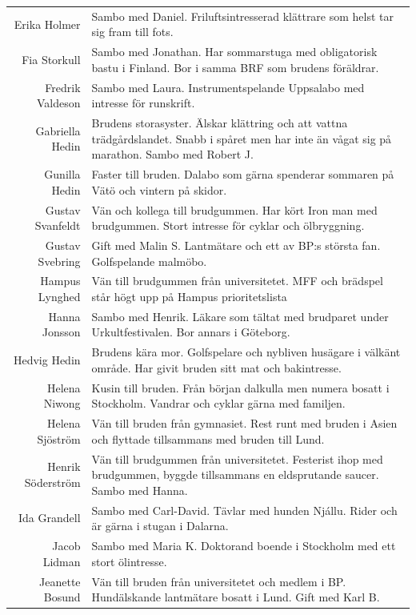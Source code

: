 \documentclass[a5paper]{article}
\begin{document}
\begin{longtable}[l]{N|L}
				Erika Holmer	&	Sambo med Daniel. Friluftsintresserad klättrare som helst tar sig fram till fots.	\\
				Fia Storkull	&	Sambo med Jonathan.  Har sommarstuga med obligatorisk bastu i Finland. Bor i samma BRF som brudens föräldrar.	\\
				Fredrik Valdeson	& Sambo med Laura. Instrumentspelande Uppsalabo med intresse för runskrift.	\\
				Gabriella Hedin	&	Brudens storasyster. Älskar klättring och att vattna trädgårdslandet. Snabb i spåret men har inte än vågat sig på marathon. Sambo med Robert J.	\\
				Gunilla Hedin	    & Faster till bruden. Dalabo som gärna spenderar sommaren på Vätö och vintern på skidor.	\\
				Gustav Svanfeldt	& Vän och kollega till brudgummen. Har kört Iron man med brudgummen. Stort intresse för cyklar och ölbryggning.	\\
				Gustav Svebring	&	Gift med Malin S. Lantmätare och ett av BP:s största fan. Golfspelande malmöbo.	\\
				Hampus Lynghed	&	Vän till brudgummen från universitetet. MFF och brädspel står högt upp på Hampus prioritetslista 	\\
				Hanna Jonsson	&	Sambo med Henrik. Läkare som tältat med brudparet under Urkultfestivalen. Bor annars i Göteborg. 	\\
				Hedvig Hedin	&	Brudens kära mor. Golfspelare och nybliven husägare i välkänt område. Har givit bruden sitt mat och bakintresse.	\\
				Helena Niwong	&	Kusin till bruden. Från början dalkulla men numera bosatt i Stockholm. Vandrar och cyklar gärna med familjen.	\\
				Helena Sjöström	&	Vän till bruden från gymnasiet. Rest runt med bruden i Asien och flyttade tillsammans med  bruden till Lund.	\\
				Henrik Söderström	&	Vän till brudgummen från universitetet. Festerist ihop med brudgummen, byggde tillsammans en eldsprutande saucer. Sambo med Hanna.	\\
				Ida Grandell	&	Sambo med Carl-David. Tävlar med hunden Njállu. Rider och är gärna i stugan i Dalarna.	\\
				Jacob Lidman	&	Sambo med Maria K. Doktorand boende i Stockholm med ett stort ölintresse. 	\\
				Jeanette Bosund	&	Vän till bruden från universitetet och medlem i BP.  Hundälskande lantmätare bosatt i Lund. Gift med Karl B.	\\

\end{longtable}
\end{document}
